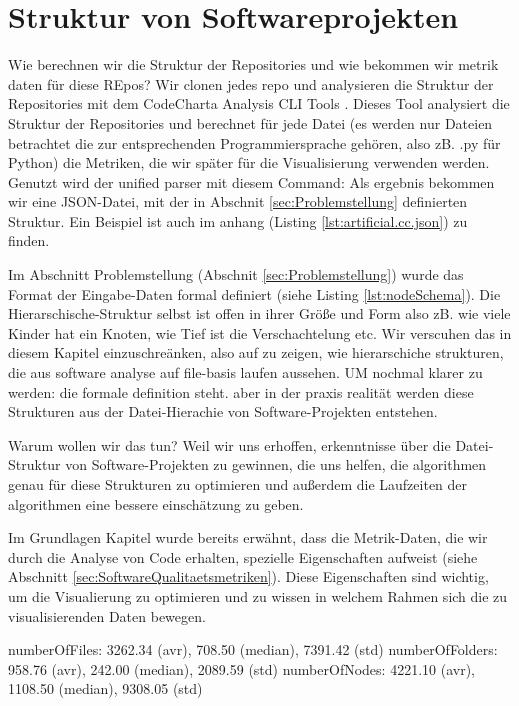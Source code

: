 \section{Struktur von Softwareprojekten} \label{sec:strukturVonSoftwareprojekten}    

Wie berechnen wir die Struktur der Repositories und wie bekommen wir metrik daten für diese REpos?
Wir clonen jedes repo und analysieren die Struktur der Repositories mit dem CodeCharta Analysis CLI Tools \cite{code_charta_wiki_ana}. Dieses Tool analysiert die Struktur der Repositories und berechnet für jede Datei (es werden nur Dateien betrachtet die zur entsprechenden Programmiersprache gehören, also zB. .py für Python) die Metriken, die wir später für die Visualisierung verwenden werden. Genutzt wird der unified parser mit diesem Command:
Als ergebnis bekommen wir eine JSON-Datei, mit der in Abschnit \ref{sec:Problemstellung} definierten Struktur. Ein Beispiel ist auch im anhang (Listing \ref{lst:artificial.cc.json}) zu finden.

Im Abschnitt Problemstellung (Abschnit \ref{sec:Problemstellung}) wurde das Format der Eingabe-Daten formal definiert (siehe Listing \ref{lst:nodeSchema}). Die Hierarschische-Struktur selbst ist offen in ihrer Größe und Form also zB. wie viele Kinder hat ein Knoten, wie Tief ist die Verschachtelung etc. Wir verscuhen das in diesem Kapitel einzuschreänken, also auf zu zeigen, wie hierarschiche strukturen, die aus software analyse auf file-basis laufen aussehen. UM nochmal klarer zu werden: die formale definition steht. aber in der praxis realität werden diese Strukturen aus der Datei-Hierachie von Software-Projekten entstehen. 

Warum wollen wir das tun? Weil wir uns erhoffen, erkenntnisse über die Datei-Struktur von Software-Projekten zu gewinnen, die uns helfen, die algorithmen genau für diese Strukturen zu optimieren und außerdem die Laufzeiten der algorithmen eine bessere einschätzung zu geben.

Im Grundlagen Kapitel wurde bereits erwähnt, dass die Metrik-Daten, die wir durch die Analyse von Code erhalten, spezielle Eigenschaften aufweist (siehe Abschnitt \ref{sec:SoftwareQualitaetsmetriken}). Diese Eigenschaften sind wichtig, um die Visualierung zu optimieren und zu wissen in welchem Rahmen sich die zu visualisierenden Daten bewegen. 

numberOfFiles: 3262.34 (avr), 708.50 (median), 7391.42 (std)
numberOfFolders: 958.76 (avr), 242.00 (median), 2089.59 (std)
numberOfNodes: 4221.10 (avr), 1108.50 (median), 9308.05 (std)

